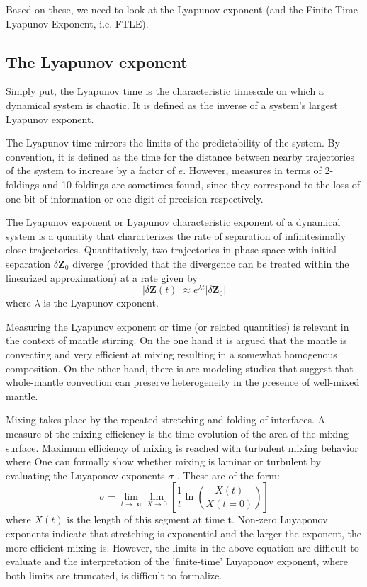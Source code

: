 Based on these, we need to look at the Lyapunov exponent (and the 
Finite Time Lyapunov Exponent, i.e. FTLE).


\subsection{The Lyapunov exponent}


Simply put, the Lyapunov time is the characteristic timescale on which a dynamical system is chaotic.
 It is defined as the inverse of a system's largest Lyapunov exponent.

The Lyapunov time mirrors the limits of the predictability of the system. By convention, it is defined 
as the time for the distance between nearby trajectories of the system to increase by a factor of $e$. 
However, measures in terms of 2-foldings and 10-foldings are sometimes found, since they correspond to 
the loss of one bit of information or one digit of precision respectively.

The Lyapunov exponent or Lyapunov characteristic exponent of a dynamical system is a quantity 
that characterizes the rate of separation of infinitesimally close trajectories. 
Quantitatively, two trajectories in phase space with initial separation $\delta \mathbf{Z}_0$ 
diverge (provided that the divergence can be treated within the linearized approximation) at a rate given by
\[
|\delta \mathbf{Z} (t)|\approx e^{\lambda t}|\delta \mathbf {Z} _{0}| 
\]
where $\lambda$ is the Lyapunov exponent. 

Measuring the Lyapunov exponent or time (or related quantities) is relevant in the context of mantle stirring. 
On the one hand it is argued that the mantle is convecting and very efficient at mixing resulting in a 
somewhat homogenous composition. On the other hand, there is are modeling studies that suggest that
whole-mantle convection can preserve heterogeneity in the presence of well-mixed mantle. 

Mixing takes place by the repeated stretching
and folding of interfaces. A measure of the
mixing efficiency is the time evolution of the area of
the mixing surface. Maximum efficiency of mixing
is reached with turbulent mixing behavior where
One can formally show whether mixing is laminar or turbulent by evaluating the Luyaponov exponents $\sigma$ .
These are of the form:
\[
\sigma = \lim_{t\rightarrow \infty} \lim_{X\rightarrow 0} \left[  \frac{1}{t} \ln \left( \frac{X(t)}{X(t=0)} \right)   \right]
\]
where $X(t)$ is the length of this segment at time t.
Non-zero Luyaponov exponents indicate that
stretching is exponential and the larger the exponent,
the more efficient mixing is.
However, the limits in the above equation are difficult to evaluate and the interpretation 
of the 'finite-time' Luyaponov exponent, where both limits are truncated, is difficult to formalize.


